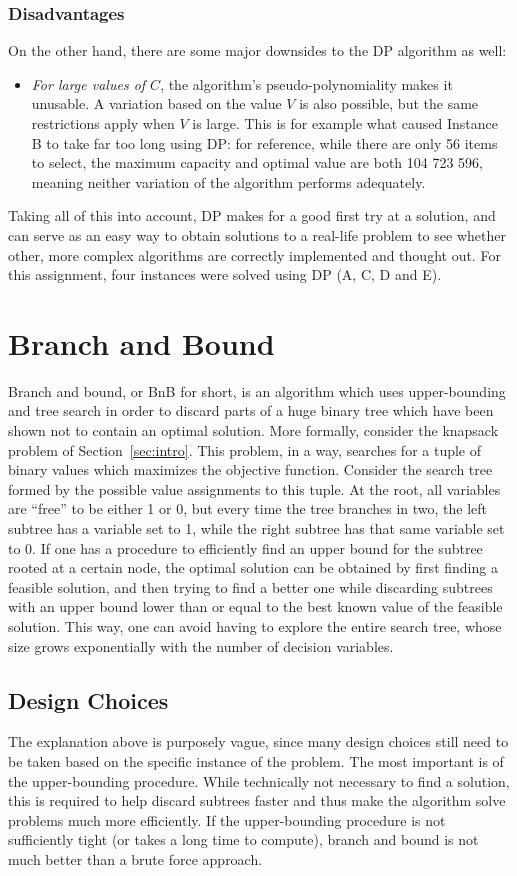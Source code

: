 \documentclass[journal]{IEEEtran}
\begin{document}
\subsubsection{Disadvantages}
On the other hand, there are some major downsides to the DP algorithm as well:
\begin{itemize}
	\item \emph{For large values of \(C\)}, the algorithm's pseudo-polynomiality makes it unusable.
	A variation based on the value \(V\) is also possible, but the same restrictions apply when \(V\) is large.
	This is for example what caused Instance B to take far too long using DP: for reference, while there are only 56 items to select, the maximum capacity and optimal value are both 104 723 596, meaning neither variation of the algorithm performs adequately.
\end{itemize}
Taking all of this into account, DP makes for a good first try at a solution, and can serve as an easy way to obtain solutions to a real-life problem to see whether other, more complex algorithms are correctly implemented and thought out.
For this assignment, four instances were solved using DP (A, C, D and E).

\section{Branch and Bound}
Branch and bound, or BnB for short, is an algorithm which uses upper-bounding and tree search in order to discard parts of a huge binary tree which have been shown not to contain an optimal solution.
More formally, consider the knapsack problem of Section~\ref{sec:intro}.
This problem, in a way, searches for a tuple of binary values which maximizes the objective function.
Consider the search tree formed by the possible value assignments to this tuple.
At the root, all variables are ``free'' to be either 1 or 0, but every time the tree branches in two, the left subtree has a variable set to 1, while the right subtree has that same variable set to 0.
If one has a procedure to efficiently find an upper bound for the subtree rooted at a certain node, the optimal solution can be obtained by first finding a feasible solution, and then trying to find a better one while discarding subtrees with an upper bound lower than or equal to the best known value of the feasible solution.
This way, one can avoid having to explore the entire search tree, whose size grows exponentially with the number of decision variables.

\subsection{Design Choices}
The explanation above is purposely vague, since many design choices still need to be taken based on the specific instance of the problem.
The most important is of the upper-bounding procedure.
While technically not necessary to find a solution, this is required to help discard subtrees faster and thus make the algorithm solve problems much more efficiently.
If the upper-bounding procedure is not sufficiently tight (or takes a long time to compute), branch and bound is not much better than a brute force approach.
\end{document}
